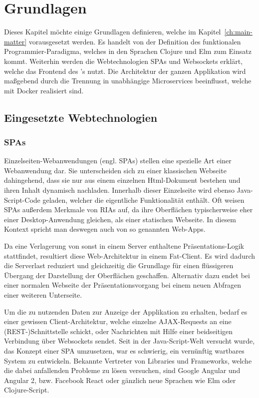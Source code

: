 \chapter{Grundlagen}
\label{ch:fundamentals}

Dieses Kapitel möchte einige Grundlagen definieren, welche im Kapitel~\ref{ch:main-matter} vorausgesetzt werden.
Es handelt von der Definition des funktionalen Programmier-Paradigma, welches in den Sprachen Clojure und Elm zum Einsatz kommt.
Weiterhin werden die Webtechnologien \acp{SPA} und Websockets erklärt, welche das Frontend des 's nutzt. 
Die Architektur der ganzen Applikation wird maßgebend durch die Trennung in unabhängige Microservices beeinflusst, welche mit Docker realisiert sind.

\section{Eingesetzte Webtechnologien}
\subsection{\aclp{SPA}}
Einzelseiten-Webanwendungen (engl. \aclp{SPA}) stellen eine spezielle Art einer Webanwendung dar.
Sie unterscheiden sich zu einer klassischen Webseite dahingehend, dass sie nur aus einem einzelnen Html-Dokument bestehen und ihren Inhalt dynamisch nachladen.
Innerhalb dieser Einzelseite wird ebenso Java-Script-Code geladen, welcher die eigentliche Funktionalität enthält.
Oft weisen \acp{SPA} außerdem Merkmale von \acp{RIA} auf, da ihre Oberflächen typischerweise eher einer Desktop-Anwendung gleichen, als einer statischen Webseite. In diesem Kontext spricht man deswegen auch von so genannten Web-Apps.
\par
Da eine Verlagerung von sonst in einem Server enthaltene Präsentations-Logik stattfindet, resultiert diese Web-Architektur in einem Fat-Client.
Es wird dadurch die Serverlast reduziert und gleichzeitig die Grundlage für einen flüssigeren Übergang der Darstellung der Oberflächen geschaffen.
Alternativ dazu endet bei einer normalen Webseite der Präsentationsvorgang bei einem neuen Abfragen einer weiteren Unterseite.
\par
Um die zu nutzenden Daten zur Anzeige der Applikation zu erhalten, bedarf es einer gewissen Client-Architektur, welche einzelne \acs{AJAX}-Requests an eine (\acs{REST}-)Schnittstelle schickt, oder Nachrichten mit Hilfe einer beidseitigen Verbindung über Websockets sendet.
Seit in der Java-Script-Welt versucht wurde, das Konzept einer \ac{SPA} umzusetzen, war es schwierig, ein vernünftig wartbares System zu entwickeln.
Bekannte Vertreter von Libraries und Frameworks, welche die dabei anfallenden Probleme zu lösen versuchen, sind Google Angular und Angular 2, \ac{bzw.} Facebook React oder gänzlich neue Sprachen wie Elm oder Clojure-Script.

